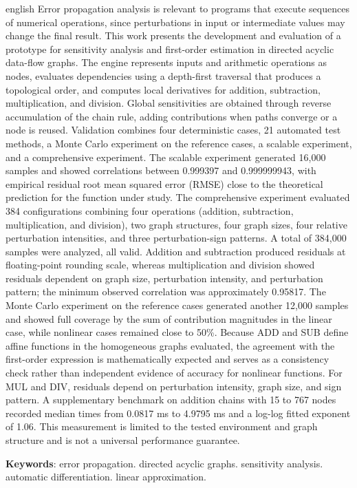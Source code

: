 \documentclass[12pt,openright,oneside,a4paper,brazil]{abntex2}
\begin{document}
\begin{resumo}[Abstract]
\begin{otherlanguage*}{english}
Error propagation analysis is relevant to programs that execute sequences of numerical operations, since perturbations in input or intermediate values may change the final result. This work presents the development and evaluation of a prototype for sensitivity analysis and first-order estimation in directed acyclic data-flow graphs. The engine represents inputs and arithmetic operations as nodes, evaluates dependencies using a depth-first traversal that produces a topological order, and computes local derivatives for addition, subtraction, multiplication, and division. Global sensitivities are obtained through reverse accumulation of the chain rule, adding contributions when paths converge or a node is reused. Validation combines four deterministic cases, 21 automated test methods, a Monte Carlo experiment on the reference cases, a scalable experiment, and a comprehensive experiment. The scalable experiment generated 16,000 samples and showed correlations between 0.999397 and 0.999999943, with empirical residual root mean squared error (RMSE) close to the theoretical prediction for the function under study. The comprehensive experiment evaluated 384 configurations combining four operations (addition, subtraction, multiplication, and division), two graph structures, four graph sizes, four relative perturbation intensities, and three perturbation-sign patterns. A total of 384,000 samples were analyzed, all valid. Addition and subtraction produced residuals at floating-point rounding scale, whereas multiplication and division showed residuals dependent on graph size, perturbation intensity, and perturbation pattern; the minimum observed correlation was approximately 0.95817. The Monte Carlo experiment on the reference cases generated another 12,000 samples and showed full coverage by the sum of contribution magnitudes in the linear case, while nonlinear cases remained close to 50\%. Because ADD and SUB define affine functions in the homogeneous graphs evaluated, the agreement with the first-order expression is mathematically expected and serves as a consistency check rather than independent evidence of accuracy for nonlinear functions. For MUL and DIV, residuals depend on perturbation intensity, graph size, and sign pattern. A supplementary benchmark on addition chains with 15 to 767 nodes recorded median times from 0.0817 ms to 4.9795 ms and a log-log fitted exponent of 1.06. This measurement is limited to the tested environment and graph structure and is not a universal performance guarantee.

\vspace{\onelineskip}
\noindent\textbf{Keywords}: error propagation. directed acyclic graphs. sensitivity analysis. automatic differentiation. linear approximation.
\end{otherlanguage*}
\end{resumo}
\end{document}

